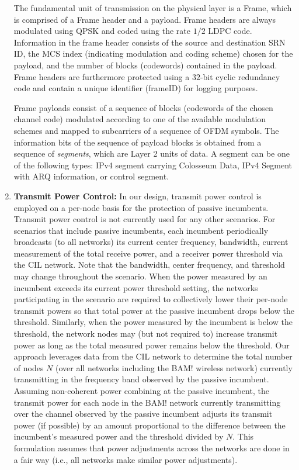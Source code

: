 \documentclass[11pt]{article}
\begin{document}
\begin{enumerate}
     The fundamental unit of transmission on the physical layer is a Frame, which is comprised of a Frame header and a payload. Frame headers are always modulated using QPSK and coded using the rate $1/2$ LDPC code. Information in the frame header consists of the source and destination SRN ID, the MCS index (indicating modulation and coding scheme) chosen for the payload, and the number of blocks (codewords) contained in the payload. Frame headers are furthermore protected using a $32$-bit cyclic redundancy code and contain a unique identifier (frameID) for logging purposes.

     Frame payloads consist of a sequence of blocks (codewords of the chosen channel code) modulated according to one of the available modulation schemes and mapped to subcarriers of a sequence of OFDM symbols. The information bits of the sequence of payload blocks is obtained from a sequence of \emph{segments}, which are Layer 2 units of data. A segment can be one of the following types: IPv4 segment carrying Colosseum Data, IPv4 Segment with ARQ information, or control segment.
     
     

     \item \textbf{Transmit Power Control:} 
     In our design, transmit power control is employed on a per-node basis for the protection of passive incumbents. Transmit power control is not currently used for any other scenarios.  For scenarios that include passive incumbents, each incumbent periodically broadcasts (to all networks) its current center frequency, bandwidth, current measurement of the total receive power, and a receiver power threshold via the CIL network.  Note that the bandwidth, center frequency, and threshold may change throughout the scenario.  When the power measured by an incumbent exceeds its current power threshold setting, the networks participating in the scenario are required to collectively lower their per-node transmit powers so that total power at the passive incumbent drops below the threshold. Similarly, when the power measured by the incumbent is below the threshold, the network nodes may (but not required to) increase transmit power as long as the total measured power remains below the threshold.  Our approach leverages data from the CIL network to determine the total number of nodes $N$ (over all networks including the BAM! wireless network) currently transmitting in the frequency band observed by the passive incumbent.  Assuming non-coherent power combining at the passive incumbent, the transmit power for each node in the BAM! network currently transmitting over the channel observed by the passive incumbent adjusts its transmit power (if possible) by an amount proportional to the difference between the incumbent's measured power and the threshold divided by $N$. This formulation assumes that power adjustments across the networks are done in a fair way (i.e., all networks make similar power adjustments). 
     

\end{enumerate}
\end{document}
